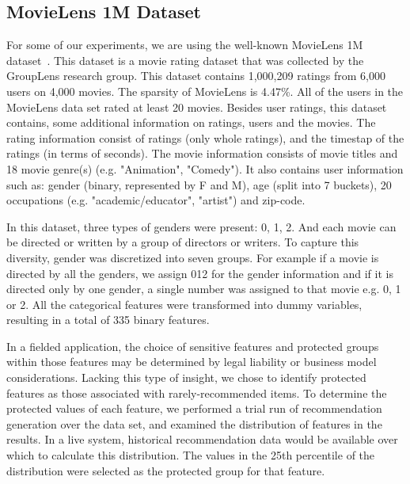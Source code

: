     \subsection{MovieLens 1M Dataset}
    For some of our experiments, we are using the well-known MovieLens 1M dataset~\cite{movielens}. This dataset is a movie rating dataset that was collected by the GroupLens research group. This dataset contains 1,000,209 ratings from 6,000 users on 4,000 movies. The sparsity of MovieLens is 4.47\%. All of the users in the MovieLens data set rated at least 20 movies.
    Besides user ratings, this dataset contains, some additional information on ratings, users and the movies. The rating information consist of ratings (only whole ratings), and the timestap of the ratings (in terms of seconds). The movie information consists of movie titles and 18 movie genre(s) (e.g. "Animation", "Comedy"). It also contains user information such as: gender (binary, represented by F and M), age (split into 7 buckets), 20 occupations (e.g. "academic/educator", "artist") and zip-code.
    
    
     In this dataset, three types of genders were present: 0, 1, 2. And each movie can be directed or written by a group of directors or writers. To capture this diversity, gender was discretized into seven groups. For example if a movie is directed by all the genders, we assign 012 for the gender information and if it is directed only by one gender, a single number was assigned to that movie e.g. 0, 1 or 2. All the categorical features were transformed into dummy variables, resulting in a total of 335 binary features.
    
    In a fielded application, the choice of sensitive features and protected groups within those features may be determined by legal liability or business model considerations. Lacking this type of insight, we chose to identify protected features as those associated with rarely-recommended items. To determine the protected values of each feature, we performed a trial run of recommendation generation over the data set, and examined the distribution of features in the results. In a live system, historical recommendation data would be available over which to calculate this distribution. The values in the 25th percentile of the distribution were selected as the protected group for that feature.

    
